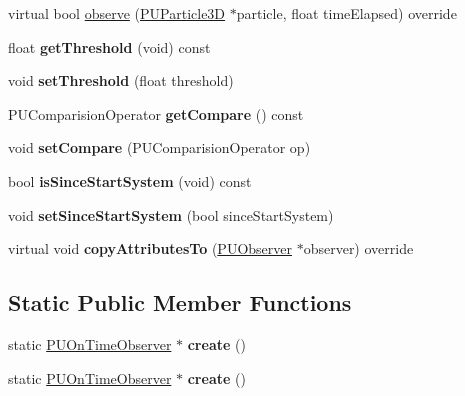 \begin{DoxyCompactItemize}
\item 
virtual bool \hyperlink{classPUOnTimeObserver_ae8ec581632549ab8b8cd7e934c17a8b9}{observe} (\hyperlink{structPUParticle3D}{P\+U\+Particle3D} $\ast$particle, float time\+Elapsed) override
\item 
\mbox{\label{classPUOnTimeObserver_a72766a2323244161a8438aae55383058}} 
float {\bfseries get\+Threshold} (void) const
\item 
\mbox{\label{classPUOnTimeObserver_aa375aa00e8dd76660d478868d2bbb353}} 
void {\bfseries set\+Threshold} (float threshold)
\item 
\mbox{\label{classPUOnTimeObserver_a0850d13dcf1c419cf370c4252e456664}} 
P\+U\+Comparision\+Operator {\bfseries get\+Compare} () const
\item 
\mbox{\label{classPUOnTimeObserver_a8b05fa44560c25ea80fd54cdc28824b8}} 
void {\bfseries set\+Compare} (P\+U\+Comparision\+Operator op)
\item 
\mbox{\label{classPUOnTimeObserver_a7ecae2a7af5b78842eb96969064f21de}} 
bool {\bfseries is\+Since\+Start\+System} (void) const
\item 
\mbox{\label{classPUOnTimeObserver_a65f5b29d378daf66cf7166ba2d6a4473}} 
void {\bfseries set\+Since\+Start\+System} (bool since\+Start\+System)
\item 
\mbox{\label{classPUOnTimeObserver_a2abcf2eabb58ed4638243fb8c5a3b8b2}} 
virtual void {\bfseries copy\+Attributes\+To} (\hyperlink{classPUObserver}{P\+U\+Observer} $\ast$observer) override
\end{DoxyCompactItemize}
\subsection*{Static Public Member Functions}
\begin{DoxyCompactItemize}
\item 
\mbox{\label{classPUOnTimeObserver_a16f9d4768b2def34a261644d28b157cc}} 
static \hyperlink{classPUOnTimeObserver}{P\+U\+On\+Time\+Observer} $\ast$ {\bfseries create} ()
\item 
\mbox{\label{classPUOnTimeObserver_a634639e347b0695a9654bae1412f0304}} 
static \hyperlink{classPUOnTimeObserver}{P\+U\+On\+Time\+Observer} $\ast$ {\bfseries create} ()
\end{DoxyCompactItemize}
